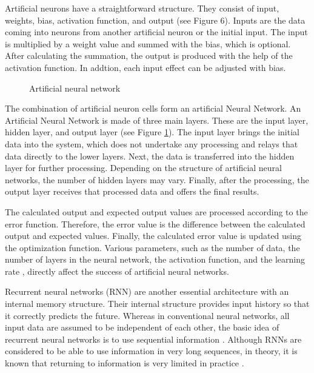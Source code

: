 Artificial neurons have a straightforward structure. They consist of input, weights, bias, activation function, and output (see Figure 6). Inputs are the data coming into neurons from another artificial neuron or the initial input. The input is multiplied by a weight value and summed with the bias, which is optional. After calculating the summation, the output is produced with the help of the activation function. In addtion, each input effect can be adjusted with bias.

\begin{figure}[htbp]
\centering
{}
\caption{Artificial neural network\cite{bre2018prediction}}
\label{fig:MethodologyArtificialNeuralNetwork}
\end{figure}

The combination of artificial neuron cells form an artificial Neural Network. An Artificial Neural Network is made of three main layers. These are the input layer, hidden layer, and output layer (see Figure \ref{fig:MethodologyArtificialNeuralNetwork}). The input layer brings the initial data into the system, which does not undertake any processing and relays that data directly to the lower layers. Next, the data is transferred into the hidden layer for further processing. Depending on the structure of artificial neural networks, the number of hidden layers may vary. Finally, after the processing, the output layer receives that processed data and offers the final results. 

The calculated output and expected output values are processed according to the error function. Therefore, the error value is the difference between the calculated output and expected values. Finally, the calculated error value is updated using the optimization function. Various parameters, such as the number of data, the number of layers in the neural network, the activation function, and the learning rate \cite{goodfellow2016deep}, directly affect the success of artificial neural networks.

Recurrent neural networks (RNN) are another essential architecture with an internal memory structure. Their internal structure provides input history so that it correctly predicts the future. Whereas in conventional neural networks, all input data are assumed to be independent of each other, the basic idea of recurrent neural networks is to use sequential information \cite{medsker1999recurrent}. Although RNNs are considered to be able to use information in very long sequences, in theory, it is known that returning to information is very limited in practice \cite{medsker1999recurrent}.

